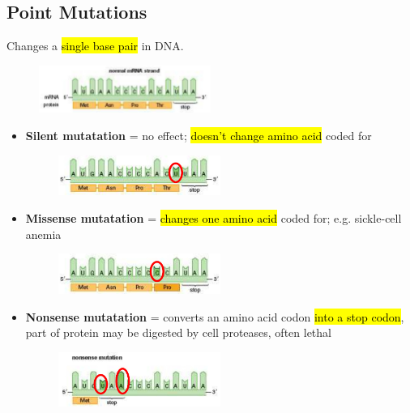 \documentclass[a4paper,12pt]{article}
\begin{document}
\subsection{Point Mutations}
Changes a \hl{single base pair} in DNA.

\begin{figure}[H]
    \centering
    \includegraphics[width=0.50\textwidth]{original}
\end{figure}

\begin{itemize}
    \item{
            \textbf{Silent mutatation} = no effect; \hl{doesn't change amino acid} coded for
            \begin{figure}[H]
                \centering
                \includegraphics[width=0.50\textwidth]{silent}
            \end{figure}
        }
    \item{
            \textbf{Missense mutatation} = \hl{changes one amino acid} coded for; e.g. sickle-cell anemia
            \begin{figure}[H]
                \centering
                \includegraphics[width=0.50\textwidth]{missense}
            \end{figure}
        }
    \item{
            \textbf{Nonsense mutatation} = converts an amino acid codon \hl{into a stop codon}, part of protein may be digested by cell proteases, often lethal
            \begin{figure}[H]
                \centering
                \includegraphics[width=0.50\textwidth]{nonsense}
            \end{figure}
        }
\end{itemize}
\end{document}
